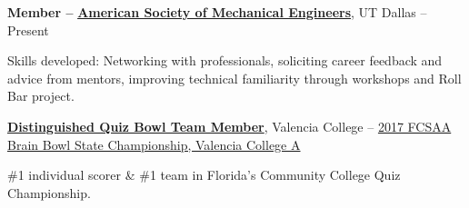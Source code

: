 \documentclass[letterpaper,MMMyyyy,nonstopmode]{simpleresumecv}
\begin{document}
\begin{Body}

\iffalse
    \BulletItem
    National Merit Scholar at the University of Texas at Dallas
    \hfill
    \DatestampYMD{2017}{05}{10} -- Present
    \begin{Detail}
    \Item
    Full-tuition scholarship with additional stipend %
    \end{Detail}

    \BulletItem 
    \href{https://www.utdallas.edu/news/2018/2/8-32826_More-than-1500-Students-Earn-Spots-on-Fall-Deans-    L_story-wide.html}
    {Dean's List,
    Fall 2017,
    University of Texas at Dallas}
    \hfill
    \DatestampYMD{2017}{12}{31}
    \begin{Detail}
    \Item
    For attaining a semester GPA of 4.00, within the top 10\% of the School of Engineering.
    \end{Detail}
\fi
\Entry
\textbf{Member --}
\href{https://www.facebook.com/groups/UTDASME/}
{\textbf{American Society of Mechanical Engineers}},
UT Dallas
\hfill
{} --
Present

\begin{Detail}
\SubBulletItem
Skills developed: Networking with professionals, soliciting career feedback and advice from mentors, improving technical familiarity through workshops and Roll Bar project.
\end{Detail}

\Entry
\href{https://www.naqt.com/stats/player/index.jsp?contact_id=383633}{\textbf{Distinguished Quiz Bowl Team Member}}, Valencia College
\hfill
{} -- 
\BulletItem
\href{https://www.naqt.com/stats/tournament/standings.jsp?tournament_id=7594}
{2017 FCSAA Brain Bowl State Championship,
Valencia College A}
\hfill
{}
\begin{Detail}
\Item
\#1 individual scorer \& \#1 team in Florida's Community College Quiz Championship.
\end{Detail}


\end{Body}
\end{document}
